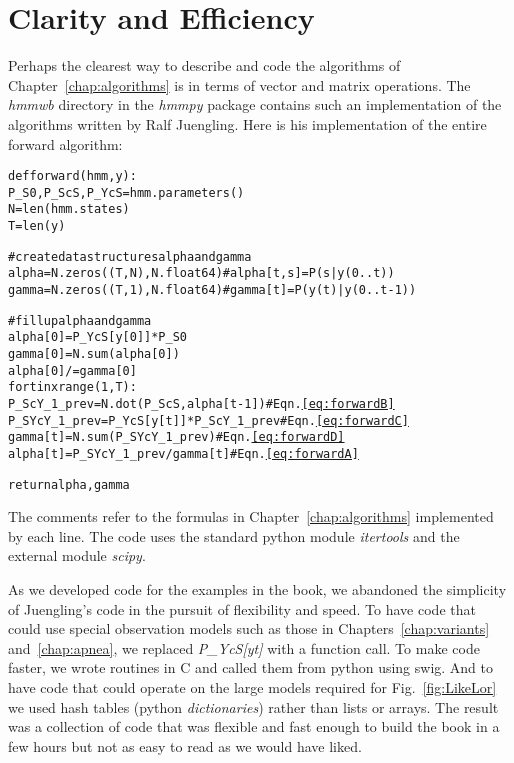 \section{Clarity and Efficiency}
\label{sec:Clarity}

Perhaps the clearest way to describe and code the algorithms of
Chapter~\ref{chap:algorithms} is in terms of vector and matrix
operations.  The \emph{hmmwb} directory in the \emph{hmmpy} package
contains such an implementation of the algorithms written by Ralf
Juengling.   Here is his implementation of the
entire forward algorithm:
\begin{alltt}
% ToDo: ?
def forward(hmm, y):
    P_S0, P_ScS, P_YcS = hmm.parameters()
    N = len(hmm.states)
    T = len(y)

    # create data structures alpha and gamma
    alpha = N.zeros((T, N), N.float64) # alpha[t,s] = P(s|y(0..t))
    gamma = N.zeros((T, 1), N.float64) # gamma[t] = P(y(t)|y(0..t-1))

    # fill up alpha and gamma
    alpha[0] = P_YcS[y[0]]*P_S0
    gamma[0] = N.sum(alpha[0])
    alpha[0] /= gamma[0]
    for t in xrange(1, T):
        P_ScY_1_prev = N.dot(P_ScS, alpha[t-1])    # Eqn. \eqref{eq:forwardB}
        P_SYcY_1_prev = P_YcS[y[t]]*P_ScY_1_prev   # Eqn. \eqref{eq:forwardC}
        gamma[t] = N.sum(P_SYcY_1_prev)            # Eqn. \eqref{eq:forwardD}
        alpha[t] = P_SYcY_1_prev/gamma[t]          # Eqn. \eqref{eq:forwardA}

    return alpha, gamma
\end{alltt}

The comments refer to the formulas in Chapter~\ref{chap:algorithms}
implemented by each line.  The code uses the standard python module
\emph{itertools} and the external module \emph{scipy}.

As we developed code for the examples in the book, we abandoned the
simplicity of Juengling's code in the pursuit of flexibility and
speed.  To have code that could use special observation models such as
those in Chapters~\ref{chap:variants} and~\ref{chap:apnea}, we
replaced \emph{P\_YcS[yt]} with a function call.  To make code faster,
we wrote routines in C and called them from python using swig.  And to
have code that could operate on the large models required for
Fig.~\ref{fig:LikeLor} we used hash tables (python
\emph{dictionaries}) rather than lists or arrays.  The result was a
collection of code that was flexible and fast enough to build the book
in a few hours but not as easy to read as we would have liked.

